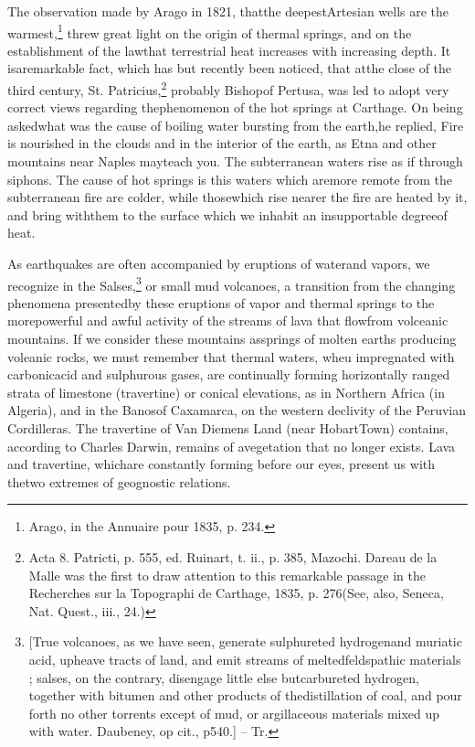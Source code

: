 The observation made by Arago in 1821, thatthe deepestArtesian wells are the warmest,\footnote{Arago, in the Annuaire pour 1835, p. 234.} threw great light on the origin of thermal springs, and on the establishment of the lawthat terrestrial heat increases with increasing depth. It isaremarkable fact, which has but recently been noticed, that atthe close of the third century, St. Patricius,\footnote{Acta 8. Patricti, p. 555, ed. Ruinart, t. ii., p. 385, Mazochi. Dareau de la Malle was the first to draw attention to this remarkable passage in the Recherches sur la Topographi de Carthage, 1835, p. 276(See, also, Seneca, Nat. Quest., iii., 24.)} probably Bishopof Pertusa, was led to adopt very correct views regarding thephenomenon of the hot springs at Carthage. On being askedwhat was the cause of boiling water bursting from the earth,he replied,  Fire is nourished in the clouds and in the interior of the earth, as Etna and other mountains near Naples mayteach you. The subterranean waters rise as if through siphons. The cause of hot springs is this waters which aremore remote from the subterranean fire are colder, while thosewhich rise nearer the fire are heated by it, and bring withthem to the surface which we inhabit an insupportable degreeof heat.

As earthquakes are often accompanied by eruptions of waterand vapors, we recognize in the Salses,\footnote{[True volcanoes, as we have seen, generate sulphureted hydrogenand muriatic acid, upheave tracts of land, and emit streams of meltedfeldspathic materials ; salses, on the contrary, disengage little else butcarbureted hydrogen, together with bitumen and other products of thedistillation of coal, and pour forth no other torrents except of mud, or argillaceous materials mixed up with water. Daubeney, op cit., p540.] -- Tr.} or small mud volcanoes, a transition from the changing phenomena presentedby these eruptions of vapor and thermal springs to the morepowerful and awful activity of the streams of lava that flowfrom volceanic mountains. If we consider these mountains assprings of molten earths producing voleanic rocks, we must remember that thermal waters, wheu impregnated with carbonicacid and sulphurous gases, are continually forming horizontally ranged strata of limestone (travertine) or conical elevations, as in Northern Africa (in Algeria), and in the Banosof Caxamarca, on the western declivity of the Peruvian Cordilleras. The travertine of Van Diemens Land (near HobartTown) contains, according to Charles Darwin, remains of avegetation that no longer exists. Lava and travertine, whichare constantly forming before our eyes, present us with thetwo extremes of geognostic relations.